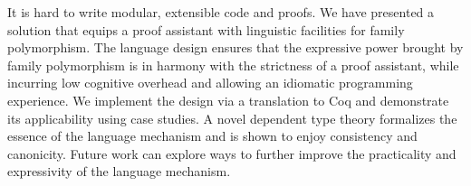 It is hard to write modular, extensible code and proofs.
We have presented a solution that equips a proof assistant with
linguistic facilities for family polymorphism.
The language design ensures that the expressive power brought by family polymorphism
is in harmony with the strictness of a proof assistant, while incurring
low cognitive overhead and allowing an idiomatic programming experience.
We implement the design via a translation to Coq and demonstrate its applicability
using case studies.
A novel dependent type theory formalizes the essence of the language mechanism
and is shown to enjoy consistency and canonicity.
Future work can explore ways to
further improve the practicality and expressivity of the language mechanism.
